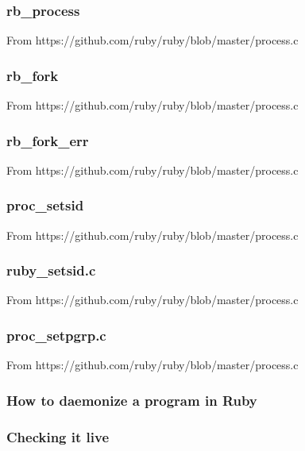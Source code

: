 \documentclass{beamer}
\begin{document}
\begin{frame}
  \frametitle{rb\_process}
  From https://github.com/ruby/ruby/blob/master/process.c

  
\end{frame}


\begin{frame}[fragile]
  \frametitle{rb\_fork}
  From https://github.com/ruby/ruby/blob/master/process.c

  
\end{frame}


\begin{frame}
  \frametitle{rb\_fork\_err}
  From https://github.com/ruby/ruby/blob/master/process.c

  
\end{frame}


\begin{frame}
  \frametitle{proc\_setsid}
  From https://github.com/ruby/ruby/blob/master/process.c

  
\end{frame}


\begin{frame}
  \frametitle{ruby\_setsid.c}
  From https://github.com/ruby/ruby/blob/master/process.c

  
\end{frame}


\begin{frame}
  \frametitle{proc\_setpgrp.c}
  From https://github.com/ruby/ruby/blob/master/process.c

  
\end{frame}


\begin{frame}
  \frametitle{How to daemonize a program in Ruby}

  
\end{frame}


\begin{frame}
  \frametitle{Checking it live}

  
\end{frame}
\end{document}
